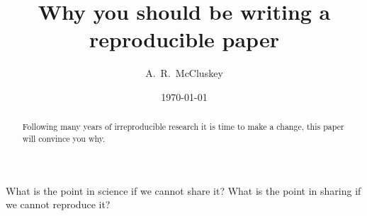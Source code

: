 \documentclass[amsmath,amssymb,twocolumn,superscriptaddress,aps,prl]{revtex4-1}
\begin{document}
\title{Why you should be writing a reproducible paper}

\author{A.~R.~McCluskey}

\date{\today}

\begin{abstract}
  Following many years of irreproducible research it is time to make a change, this paper will convince you why.
\end{abstract}

\maketitle

What is the point in science if we cannot share it?
What is the point in sharing if we cannot reproduce it?

\lipsum
\end{document}
